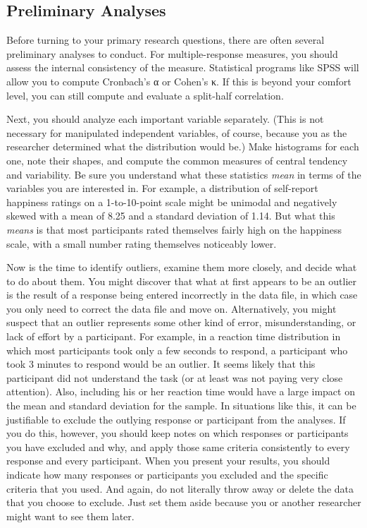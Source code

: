 \documentclass[
]{krantz}
\begin{document}
\hypertarget{preliminary-analyses}{%
\subsection*{Preliminary Analyses}\label{preliminary-analyses}}


Before turning to your primary research questions, there are often several preliminary analyses to conduct. For multiple-response measures, you should assess the internal consistency of the measure. Statistical programs like SPSS will allow you to compute Cronbach's α or Cohen's κ. If this is beyond your comfort level, you can still compute and evaluate a split-half correlation.

Next, you should analyze each important variable separately. (This is not necessary for manipulated independent variables, of course, because you as the researcher determined what the distribution would be.) Make histograms for each one, note their shapes, and compute the common measures of central tendency and variability. Be sure you understand what these statistics \emph{mean} in terms of the variables you are interested in. For example, a distribution of self-report happiness ratings on a 1-to-10-point scale might be unimodal and negatively skewed with a mean of 8.25 and a standard deviation of 1.14. But what this \emph{means} is that most participants rated themselves fairly high on the happiness scale, with a small number rating themselves noticeably lower.

Now is the time to identify outliers, examine them more closely, and decide what to do about them. You might discover that what at first appears to be an outlier is the result of a response being entered incorrectly in the data file, in which case you only need to correct the data file and move on. Alternatively, you might suspect that an outlier represents some other kind of error, misunderstanding, or lack of effort by a participant. For example, in a reaction time distribution in which most participants took only a few seconds to respond, a participant who took 3 minutes to respond would be an outlier. It seems likely that this participant did not understand the task (or at least was not paying very close attention). Also, including his or her reaction time would have a large impact on the mean and standard deviation for the sample. In situations like this, it can be justifiable to exclude the outlying response or participant from the analyses. If you do this, however, you should keep notes on which responses or participants you have excluded and why, and apply those same criteria consistently to every response and every participant. When you present your results, you should indicate how many responses or participants you excluded and the specific criteria that you used. And again, do not literally throw away or delete the data that you choose to exclude. Just set them aside because you or another researcher might want to see them later.
\end{document}
